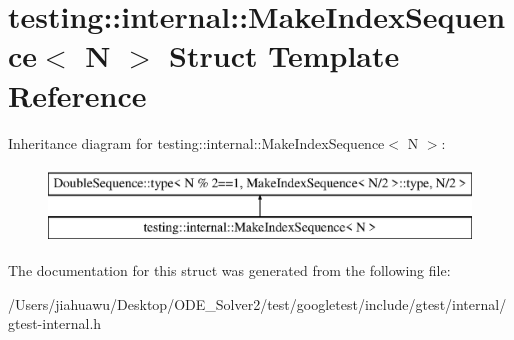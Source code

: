 \hypertarget{structtesting_1_1internal_1_1_make_index_sequence}{}\section{testing\+:\+:internal\+:\+:Make\+Index\+Sequence$<$ N $>$ Struct Template Reference}
\label{structtesting_1_1internal_1_1_make_index_sequence}
Inheritance diagram for testing\+:\+:internal\+:\+:Make\+Index\+Sequence$<$ N $>$\+:\begin{figure}[H]
\begin{center}
\leavevmode
\includegraphics[height=2.000000cm]{structtesting_1_1internal_1_1_make_index_sequence}
\end{center}
\end{figure}


The documentation for this struct was generated from the following file\+:\begin{DoxyCompactItemize}
\item 
/\+Users/jiahuawu/\+Desktop/\+O\+D\+E\+\_\+\+Solver2/test/googletest/include/gtest/internal/gtest-\/internal.\+h\end{DoxyCompactItemize}
